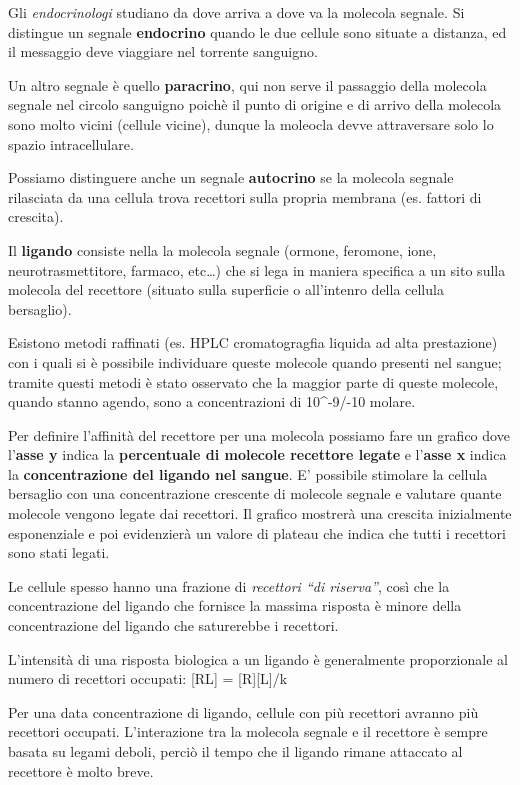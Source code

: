 \documentclass[]{article}
\begin{document}
Gli \emph{endocrinologi} studiano da dove arriva a dove va la molecola
segnale. Si distingue un segnale \textbf{endocrino} quando le due
cellule sono situate a distanza, ed il messaggio deve viaggiare nel
torrente sanguigno.

Un altro segnale è quello \textbf{paracrino}, qui non serve il passaggio
della molecola segnale nel circolo sanguigno poichè il punto di origine
e di arrivo della molecola sono molto vicini (cellule vicine), dunque la
moleocla devve attraversare solo lo spazio intracellulare.

Possiamo distinguere anche un segnale \textbf{autocrino} se la molecola
segnale rilasciata da una cellula trova recettori sulla propria membrana
(es. fattori di crescita).

Il \textbf{ligando} consiste nella la molecola segnale (ormone,
feromone, ione, neurotrasmettitore, farmaco, etc\ldots{}) che si lega in
maniera specifica a un sito sulla molecola del recettore (situato sulla
superficie o all'intenro della cellula bersaglio).

Esistono metodi raffinati (es. HPLC cromatogragfia liquida ad alta
prestazione) con i quali si è possibile individuare queste molecole
quando presenti nel sangue; tramite questi metodi è stato osservato che
la maggior parte di queste molecole, quando stanno agendo, sono a
concentrazioni di 10\^{}-9/-10 molare.

Per definire l'affinità del recettore per una molecola possiamo fare un
grafico dove l'\textbf{asse y} indica la \textbf{percentuale di molecole
recettore legate} e l'\textbf{asse x} indica la \textbf{concentrazione
del ligando nel sangue}. E' possibile stimolare la cellula bersaglio con
una concentrazione crescente di molecole segnale e valutare quante
molecole vengono legate dai recettori. Il grafico mostrerà una crescita
inizialmente esponenziale e poi evidenzierà un valore di plateau che
indica che tutti i recettori sono stati legati.

Le cellule spesso hanno una frazione di \emph{recettori ``di riserva''},
così che la concentrazione del ligando che fornisce la massima risposta
è minore della concentrazione del ligando che saturerebbe i recettori.

L'intensità di una risposta biologica a un ligando è generalmente
proporzionale al numero di recettori occupati: {[}RL{]} =
{[}R{]}{[}L{]}/k

Per una data concentrazione di ligando, cellule con più recettori
avranno più recettori occupati. L'interazione tra la molecola segnale e
il recettore è sempre basata su legami deboli, perciò il tempo che il
ligando rimane attaccato al recettore è molto breve.
\end{document}
